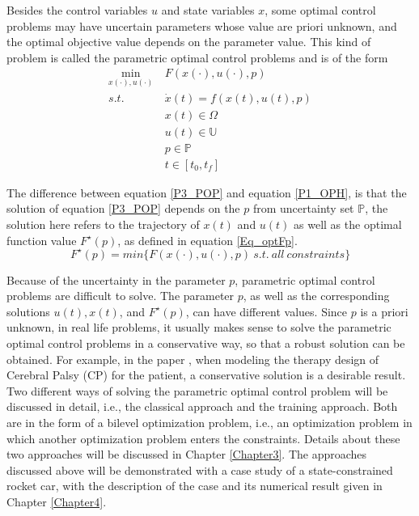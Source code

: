 \documentclass  [
  paper    = a4,
  BCOR     = 10mm,
  twoside,
  fontsize = 12pt,
  fleqn,
  toc      = bibnumbered,
  toc      = listofnumbered,
  numbers  = noendperiod,
  headings = normal,
  listof   = leveldown,
  version  = 3.03
]                                       {scrreprt}
\newcommand{\<}{\langle}
\renewcommand{\>}{\rangle}
\begin{document}
Besides the control variables $u$ and state variables $x$, some optimal control problems may have uncertain parameters whose value are priori unknown, and the optimal objective value depends on the parameter value. This kind of problem is called the parametric optimal control problems and is of the form 
      \begin{equation}
	\begin{aligned}
	\underset{x(\cdot), u(\cdot)}{\text{min}}  \ &  F(x(\cdot), u(\cdot), p) \\
	s.t.\ \  &  \dot{x} (t) = f(x(t), u(t),p)\\ 
	& x(t) \in \Omega \\
	& u(t) \in \mathbb{U}  \\
	& p  \in   \mathbb{P}  \\
	& t \in [t_0, t_f]
\end{aligned}
\label{P3_POP}
\end{equation}
  
The difference between equation \ref{P3_POP} and equation  \ref{P1_OPH}, is that the solution of equation \ref{P3_POP} depends on the $p$ from uncertainty set $ \mathbb{P}$, the solution here refers to the trajectory of $x(t)$ and $u(t)$ as well as the optimal function value $F^\star(p)$, as defined in equation \ref{Eq_optFp}.
\begin{equation}
	F^\star(p) = min \{ F(x(\cdot), u(\cdot), p) \ s.t. \  all \ constraints\}
	\label{Eq_optFp}
\end{equation}	

Because of the uncertainty in the parameter $p$, parametric optimal control problems are difficult to solve. The parameter $p$, as well as the corresponding solutions $u(t), x(t)$, and $F^\star(p)$, can have different values. Since $p$ is a priori unknown, in real life problems, it usually makes sense to solve the parametric optimal control problems in a conservative way, so that a robust solution can be obtained. For example, in the paper \cite{MatSch22}, when modeling the therapy design of Cerebral Palsy (CP) for the patient, a conservative solution is a desirable result. Two different ways of solving the parametric optimal control problem will be discussed in detail, i.e., the classical approach and the training approach. Both are in the form of a bilevel optimization problem, i.e., an optimization problem in which another optimization problem enters the constraints. Details about these two approaches will be discussed in Chapter \ref{Chapter3}. The approaches discussed above will be demonstrated with a case study of a state-constrained rocket car, with the description of the case and its numerical result given in Chapter \ref{Chapter4}.
\end{document}
